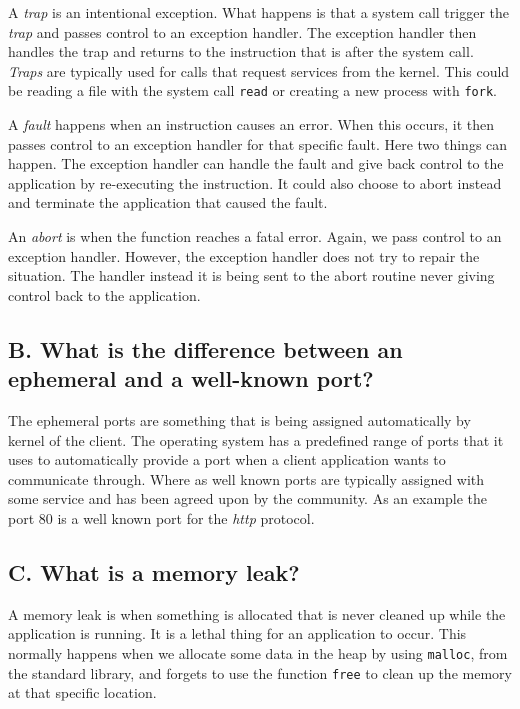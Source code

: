 \documentclass[11pt]{article}
\newcommand{\code}[1]{{\colorbox{lightgray!15}{\color{black}\texttt{#1}}}}
\begin{document}
A \textit{trap} is an intentional exception. What happens is that a system call trigger the \textit{trap} and passes control 
to an exception handler. The exception handler then handles the trap and returns to the instruction that is after the system call.
\textit{Traps} are typically used for calls that request services from the kernel. This could be reading a file with the system call \code{read}
or creating a new process with \code{fork}.

A \textit{fault} happens when an instruction causes an error. When this occurs, it then passes control to an exception handler for that specific fault.
Here two things can happen. The exception handler can handle the fault and give back control to the application by re-executing the instruction. 
It could also choose to abort instead and terminate the application that caused the fault.

An \textit{abort} is when the function reaches a fatal error. Again, we pass control to an exception handler.
However, the exception handler does not try to repair the situation. The handler instead it is being sent to the abort routine 
never giving control back to the application.

\subsection{B. What is the difference between an ephemeral and a well-known port?}
The ephemeral ports are something that is being assigned automatically by kernel of the client. The operating system has a predefined range of ports that it uses to automatically provide a port when a client application wants to communicate through. 
Where as well known ports are typically assigned with some service and has been 
agreed upon by the community. As an example the port 80 is a well known port for the \textit{http} protocol.

\subsection{C. What is a memory leak?}
A memory leak is when something is allocated that is never cleaned up while the application is running. 
It is a lethal thing for an application to occur. This normally happens when we allocate some data in the heap
by using \code{malloc}, from the standard library, and forgets to use the function \code{free} to clean up the memory
at that specific location.
\end{document}
